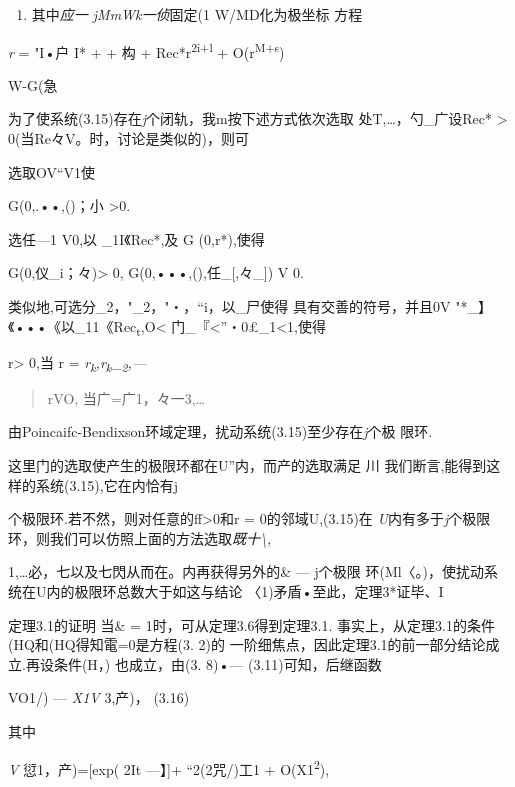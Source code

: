 \documentclass{article}
\begin{document}
\begin{enumerate}
\def\labelenumi{\arabic{enumi}.}
\setcounter{enumi}{14}
\item
  其中\emph{应一 jMmWk一侦}固定(1 W/MD化为极坐标 方程
\end{enumerate}

\emph{r} = "I•户 I* + + 构 + Rec*r\textsuperscript{2i+l} +
O(r\textsuperscript{M+s})

W-G(急

为了使系统(3.15)存在\emph{j}个闭轨，我m按下述方式依次选取
处T,\ldots{}，勺\_广设Rec* \textgreater{}
0(当Re々V。时，讨论是类似的)，则可

选取OV``V1使

G(0,.••,()；小 \textgreater{}0.

选任---1 V0,以 \_1I《Rec*,及 G (0,r*),使得

G(0,仪\_i；々)\textgreater{} 0, G(0,•••,(),任\_{[},々\_{]}) V 0.

类似地,可选分\_2，"\_2，"・，``i，以\_尸使得 具有交善的符号，并且0V
"*\_】《•••《以\_11《\textbar{}Rec\textsubscript{t}\textbar{},O\textless{}
门\_『\textless{}''・0£\_1\textless{}1,使得

r\textgreater{} 0,当 r =
\emph{r\textsubscript{k},r\textsubscript{k}\_\textsubscript{2},---}

\begin{quote}
rVO, 当广=广1，々一3,\ldots{}
\end{quote}

由Poincaifc-Bendixson环域定理，扰动系统(3.15)至少存在\emph{j}个极 限环.

这里门的选取使产生的极限环都在U''内，而产的选取满足 \textbar{}川
我们断言,能得到这样的系统(3.15),它在内恰有j

个极限环.若不然，则对任意的ff\textgreater{}0和r = 0的邻域U,(3.15)在
\emph{U}内有多于\emph{j}个极限环，则我们可以仿照上面的方法选取\emph{既十\textbackslash{},}

1,\ldots{}必，七以及七閃从而在。内再获得另外的\& --- j个极限
环(Ml〈。)，使扰动系统在U内的极限环总数大于如这与结论
〈1)矛盾•至此，定理3*证毕、I

定理3.1的证明 当\& = 1时，可从定理3.6得到定理3.1.
事实上，从定理3.1的条件(HQ和(HQ得知電=0是方程(3. 2)的
一阶细焦点，因此定理3.1的前一部分结论成立.再设条件(H，) 也成立，由(3.
8)•--- (3.11)可知，后继函数

VO1/) --- \emph{X1V} 3,产)， (3.16)

其中

\emph{V} 愆1，产)={[}exp( 2It ---】{]}+ ``2(2咒/)工1 +
O(X1\textsuperscript{2}),
\end{document}

